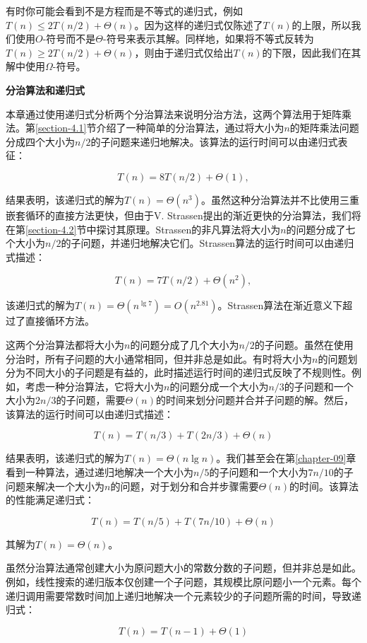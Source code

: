 \documentclass[lang=cn,newtx,10pt,scheme=chinese]{elegantbook}
\begin{document}
有时你可能会看到不是方程而是不等式的递归式，例如$T(n) \leq 2 T(n / 2)+\Theta(n)$。因为这样的递归式仅陈述了$T(n)$的上限，所以我们使用$O$-符号而不是$\Theta$-符号来表示其解。同样地，如果将不等式反转为$T(n) \geq 2 T(n / 2)+\Theta(n)$，则由于递归式仅给出$T(n)$的下限，因此我们在其解中使用$\Omega$-符号。

\textbf{分治算法和递归式}

本章通过使用递归式分析两个分治算法来说明分治方法，这两个算法用于矩阵乘法。第\ref{section-4.1}节介绍了一种简单的分治算法，通过将大小为$n$的矩阵乘法问题分成四个大小为$n/2$的子问题来递归地解决。该算法的运行时间可以由递归式表征：

$$
T(n)=8 T(n / 2)+\Theta(1),
$$

结果表明，该递归式的解为$T(n)=\Theta\left(n^3\right)$。虽然这种分治算法并不比使用三重嵌套循环的直接方法更快，但由于V. Strassen提出的渐近更快的分治算法，我们将在第\ref{section-4.2}节中探讨其原理。Strassen的非凡算法将大小为$n$的问题分成了七个大小为$n/2$的子问题，并递归地解决它们。Strassen算法的运行时间可以由递归式描述：

$$
T(n)=7 T(n / 2)+\Theta\left(n^2\right),
$$

该递归式的解为$T(n)=\Theta\left(n^{\lg 7}\right)=O\left(n^{2.81}\right)$。Strassen算法在渐近意义下超过了直接循环方法。

这两个分治算法都将大小为$n$的问题分成了几个大小为$n/2$的子问题。虽然在使用分治时，所有子问题的大小通常相同，但并非总是如此。有时将大小为$n$的问题划分为不同大小的子问题是有益的，此时描述运行时间的递归式反映了不规则性。例如，考虑一种分治算法，它将大小为$n$的问题分成一个大小为$n/3$的子问题和一个大小为$2n/3$的子问题，需要$\Theta(n)$的时间来划分问题并合并子问题的解。然后，该算法的运行时间可以由递归式描述：

$$
T(n)=T(n / 3)+T(2 n / 3)+\Theta(n)
$$

结果表明，该递归式的解为$T(n)=\Theta(n \lg n)$。我们甚至会在第\ref{chapter-09}章看到一种算法，通过递归地解决一个大小为$n/5$的子问题和一个大小为$7n/10$的子问题来解决一个大小为$n$的问题，对于划分和合并步骤需要$\Theta(n)$的时间。该算法的性能满足递归式：

$$
T(n)=T(n / 5)+T(7 n / 10)+\Theta(n)
$$

其解为$T(n)=\Theta(n)$。

虽然分治算法通常创建大小为原问题大小的常数分数的子问题，但并非总是如此。例如，线性搜索的递归版本仅创建一个子问题，其规模比原问题小一个元素。每个递归调用需要常数时间加上递归地解决一个元素较少的子问题所需的时间，导致递归式：

$$
T(n)=T(n-1)+\Theta(1)
$$
\end{document}
